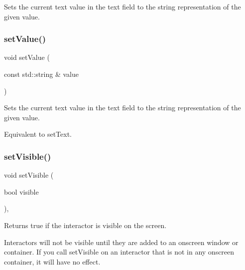Sets the current text value in the text field to the string representation of the given value. 

\mbox{\label{classsgl_1_1GTextField_ab18c7a418be64c4f909beebc277a1321}} 
\subsubsection{\texorpdfstring{set\+Value()}{setValue()}\hspace{0.1cm}{\footnotesize\ttfamily [5/5]}}
{\footnotesize\ttfamily void set\+Value (\begin{DoxyParamCaption}\item[{const std\+::string \&}]{value }\end{DoxyParamCaption})\hspace{0.3cm}{\ttfamily [virtual]}}



Sets the current text value in the text field to the string representation of the given value. 

Equivalent to set\+Text. \mbox{\label{classsgl_1_1GInteractor_a18e44e30b31525a243960ca3928125aa}} 
\subsubsection{\texorpdfstring{set\+Visible()}{setVisible()}}
{\footnotesize\ttfamily void set\+Visible (\begin{DoxyParamCaption}\item[{bool}]{visible }\end{DoxyParamCaption})\hspace{0.3cm}{\ttfamily [virtual]}, {\ttfamily [inherited]}}



Returns true if the interactor is visible on the screen. 

Interactors will not be visible until they are added to an onscreen window or container. If you call set\+Visible on an interactor that is not in any onscreen container, it will have no effect. 


